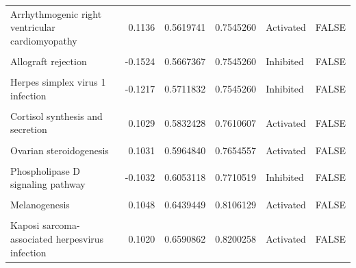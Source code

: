 \documentclass[9pt,a4paper,]{extarticle}
\begin{document}
\begin{table}
{\begin{tabular}[t]{lrrrll}
Arrhythmogenic right ventricular cardiomyopathy & 0.1136 & 0.5619741 & 0.7545260 & Activated & FALSE\\
\cellcolor{gray!6}{Autoimmune thyroid disease} & \cellcolor{gray!6}{-0.1524} & \cellcolor{gray!6}{0.5667367} & \cellcolor{gray!6}{0.7545260} & \cellcolor{gray!6}{Inhibited} & \cellcolor{gray!6}{FALSE}\\
Allograft rejection & -0.1524 & 0.5667367 & 0.7545260 & Inhibited & FALSE\\
\addlinespace
\cellcolor{gray!6}{Long-term potentiation} & \cellcolor{gray!6}{-0.1064} & \cellcolor{gray!6}{0.5711236} & \cellcolor{gray!6}{0.7545260} & \cellcolor{gray!6}{Inhibited} & \cellcolor{gray!6}{FALSE}\\
Herpes simplex virus 1 infection & -0.1217 & 0.5711832 & 0.7545260 & Inhibited & FALSE\\
\cellcolor{gray!6}{Calcium signaling pathway} & \cellcolor{gray!6}{-0.0977} & \cellcolor{gray!6}{0.5762221} & \cellcolor{gray!6}{0.7565125} & \cellcolor{gray!6}{Inhibited} & \cellcolor{gray!6}{FALSE}\\
Cortisol synthesis and secretion & 0.1029 & 0.5832428 & 0.7610607 & Activated & FALSE\\
\cellcolor{gray!6}{Apoptosis - multiple species} & \cellcolor{gray!6}{0.1031} & \cellcolor{gray!6}{0.5944385} & \cellcolor{gray!6}{0.7654557} & \cellcolor{gray!6}{Activated} & \cellcolor{gray!6}{FALSE}\\
\addlinespace
Ovarian steroidogenesis & 0.1031 & 0.5964840 & 0.7654557 & Activated & FALSE\\
\cellcolor{gray!6}{GABAergic synapse} & \cellcolor{gray!6}{-0.1427} & \cellcolor{gray!6}{0.5973416} & \cellcolor{gray!6}{0.7654557} & \cellcolor{gray!6}{Inhibited} & \cellcolor{gray!6}{FALSE}\\
Phospholipase D signaling pathway & -0.1032 & 0.6053118 & 0.7710519 & Inhibited & FALSE\\
\cellcolor{gray!6}{Renal cell carcinoma} & \cellcolor{gray!6}{0.0884} & \cellcolor{gray!6}{0.6229819} & \cellcolor{gray!6}{0.7888647} & \cellcolor{gray!6}{Activated} & \cellcolor{gray!6}{FALSE}\\
Melanogenesis & 0.1048 & 0.6439449 & 0.8106129 & Activated & FALSE\\
\addlinespace
\cellcolor{gray!6}{Renin-angiotensin system} & \cellcolor{gray!6}{0.0905} & \cellcolor{gray!6}{0.6478521} & \cellcolor{gray!6}{0.8107622} & \cellcolor{gray!6}{Activated} & \cellcolor{gray!6}{FALSE}\\
Kaposi sarcoma-associated herpesvirus infection & 0.1020 & 0.6590862 & 0.8200258 & Activated & FALSE\\

\end{tabular}}
\end{table}
\end{document}
